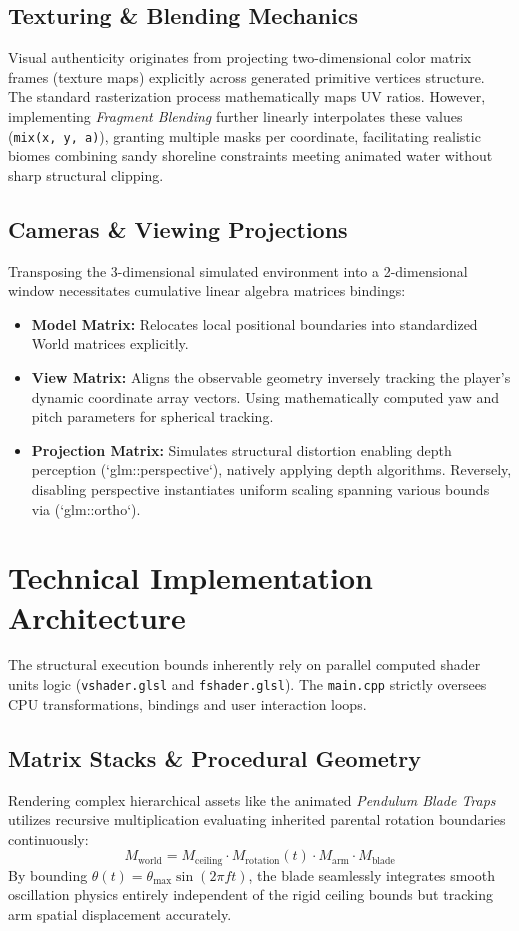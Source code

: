 \documentclass[12pt, a4paper]{article}
\begin{document}
\subsection{Texturing \& Blending Mechanics}
Visual authenticity originates from projecting two-dimensional color matrix frames (texture maps) explicitly across generated primitive vertices structure. The standard rasterization process mathematically maps UV ratios. However, implementing \textit{Fragment Blending} further linearly interpolates these values (\texttt{mix(x, y, a)}), granting multiple masks per coordinate, facilitating realistic biomes combining sandy shoreline constraints meeting animated water without sharp structural clipping.

\subsection{Cameras \& Viewing Projections}
Transposing the 3-dimensional simulated environment into a 2-dimensional window necessitates cumulative linear algebra matrices bindings:
\begin{itemize}
    \item \textbf{Model Matrix:} Relocates local positional boundaries into standardized World matrices explicitly.
    \item \textbf{View Matrix:} Aligns the observable geometry inversely tracking the player's dynamic coordinate array vectors. Using mathematically computed yaw and pitch parameters for spherical tracking.
    \item \textbf{Projection Matrix:} Simulates structural distortion enabling depth perception (`glm::perspective`), natively applying depth algorithms. Reversely, disabling perspective instantiates uniform scaling spanning various bounds via (`glm::ortho`).
\end{itemize}

\newpage
\section{Technical Implementation Architecture}

The structural execution bounds inherently rely on parallel computed shader units logic (\texttt{vshader.glsl} and \texttt{fshader.glsl}). The \texttt{main.cpp} strictly oversees CPU transformations, bindings and user interaction loops.

\subsection{Matrix Stacks \& Procedural Geometry}
Rendering complex hierarchical assets like the animated \textit{Pendulum Blade Traps} utilizes recursive multiplication evaluating inherited parental rotation boundaries continuously:
$$ M_{\text{world}} = M_{\text{ceiling}} \cdot M_{\text{rotation}}(t) \cdot M_{\text{arm}} \cdot M_{\text{blade}} $$
By bounding $\theta(t) = \theta_{\text{max}}\sin(2\pi ft)$, the blade seamlessly integrates smooth oscillation physics entirely independent of the rigid ceiling bounds but tracking arm spatial displacement accurately.
\end{document}
